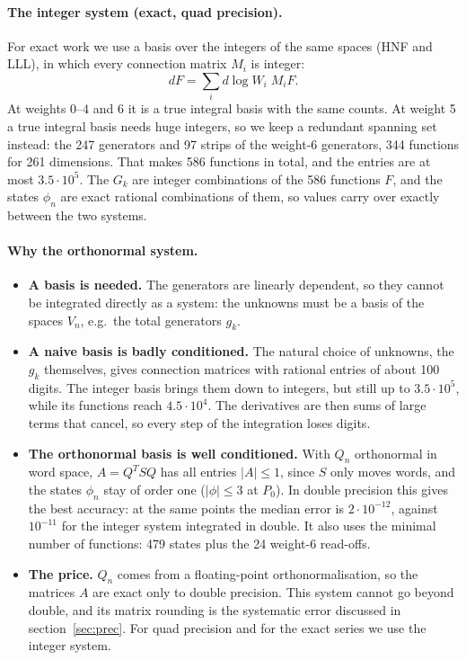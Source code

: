 \documentclass[11pt]{article}
\begin{document}
\paragraph{The integer system (exact, quad precision).} For exact work we use a basis over the integers of the same
spaces (HNF and LLL), in which every connection matrix $M_i$ is integer:
\[
  dF=\sum_i d\log W_i\;M_iF .
\]
At weights $0$--$4$ and $6$ it is a true integral basis with the same counts. At weight 5 a true integral basis needs
huge integers, so we keep a redundant spanning set instead: the 247 generators and 97 strips of the weight-6
generators, 344 functions for 261 dimensions. That makes 586 functions in total, and the entries are at most
$3.5\cdot10^5$. The $G_k$ are integer combinations of the 586 functions $F$, and the states $\phi_n$ are exact rational
combinations of them, so values carry over exactly between the two systems.

\paragraph{Why the orthonormal system.}
\begin{itemize}
\item \textbf{A basis is needed.} The generators are linearly dependent, so they cannot be integrated directly as a
  system: the unknowns must be a basis of the spaces $V_n$, e.g.\ the total generators $g_k$.
\item \textbf{A naive basis is badly conditioned.} The natural choice of unknowns, the $g_k$ themselves, gives
  connection matrices with rational entries of about 100 digits. The integer basis brings them down to integers, but
  still up to $3.5\cdot10^5$, while its functions reach $4.5\cdot10^4$. The derivatives are then sums of large terms that
  cancel, so every step of the integration loses digits.
\item \textbf{The orthonormal basis is well conditioned.} With $Q_n$ orthonormal in word space, $A=Q^TSQ$ has all
  entries $|A|\le1$, since $S$ only moves words, and the states $\phi_n$ stay of order one ($|\phi|\le3$ at $P_0$). In double
  precision this gives the best accuracy: at the same points the median error is $2\cdot10^{-12}$, against
  $10^{-11}$ for the integer system integrated in double. It also uses the minimal number of functions: 479 states plus
  the 24 weight-6 read-offs.
\item \textbf{The price.} $Q_n$ comes from a floating-point orthonormalisation, so the matrices $A$ are exact only to
  double precision. This system cannot go beyond double, and its matrix rounding is the systematic error discussed in
  section~\ref{sec:prec}. For quad precision and for the exact series we use the integer system.
\end{itemize}
\end{document}
